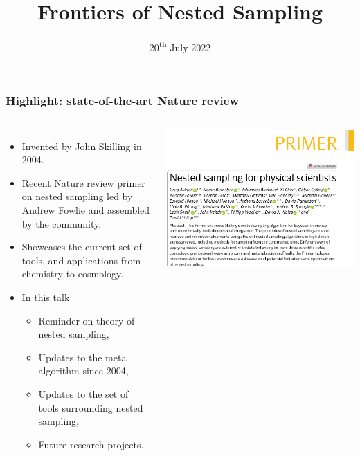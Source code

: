\documentclass[aspectratio=169]{beamer}
\title{Frontiers of Nested Sampling}
\date{20\textsuperscript{th} July 2022}
\begin{document}
\begin{frame}
    \titlepage
\end{frame}

\begin{frame}
    \frametitle{Highlight: state-of-the-art Nature review}
    \begin{columns}
        \begin{itemize}
            \item Invented by John Skilling in 2004.
            \item Recent Nature review primer on nested sampling led by Andrew Fowlie and assembled by the community.
            \item Showcases the current set of tools, and applications from chemistry to cosmology.
            \item In this talk
                \begin{itemize}
                    \item Reminder on theory of nested sampling,
                    \item Updates to the meta algorithm since 2004,
                    \item Updates to the set of tools surrounding nested sampling,
                    \item Future research projects.
                \end{itemize}
        \end{itemize}
        \includegraphics[width=\textwidth]{figures/nature1}

\end{columns}
\end{frame}
\end{document}
